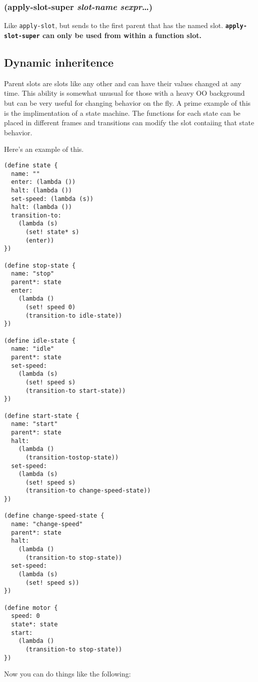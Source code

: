 \documentclass{article}
\begin{document}
\subsubsection{(apply-slot-super \emph{slot-name} \emph{sexpr}\ldots{})}

Like \verb|apply-slot|, but sends to the first parent that has the named slot.
\textbf{\texttt{apply-slot-super} can only be used from within a function slot.}

\subsection{Dynamic inheritence}\label{sec:dynamic-inheritence}

Parent slots are slots like any other and can have their values changed at any time. This
ability is somewhat unusual for those with a heavy OO background but can be very useful for
changing behavior on the fly. A prime example of this is the implimentation of a state
machine. The functions for each state can be placed in different frames and transitions can
modify the slot contaiing that state behavior.

Here’s an example of this.

\begin{verbatim}
(define state {
  name: ""
  enter: (lambda ())
  halt: (lambda ())
  set-speed: (lambda (s))
  halt: (lambda ())
  transition-to: 
    (lambda (s)
      (set! state* s)
      (enter))
})

(define stop-state {
  name: "stop"
  parent*: state
  enter: 
    (lambda ()
      (set! speed 0)
      (transition-to idle-state))
})

(define idle-state {
  name: "idle"
  parent*: state
  set-speed: 
    (lambda (s)
      (set! speed s)
      (transition-to start-state))
})

(define start-state {
  name: "start"
  parent*: state
  halt: 
    (lambda ()
      (transition-tostop-state))
  set-speed: 
    (lambda (s)
      (set! speed s)
      (transition-to change-speed-state))
})

(define change-speed-state {
  name: "change-speed"
  parent*: state
  halt: 
    (lambda ()
      (transition-to stop-state))
  set-speed: 
    (lambda (s)
      (set! speed s))
})

(define motor {
  speed: 0
  state*: state
  start: 
    (lambda () 
      (transition-to stop-state))
})
\end{verbatim}

Now you can do things like the following:
\end{document}
